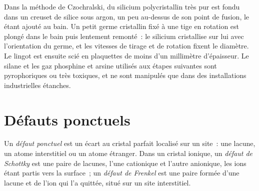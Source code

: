 \begin{inthelab}
Dans la méthode de Czochralski, du silicium polycristallin très pur est
fondu dans un creuset de silice sous argon, un peu au-dessus de son point
de fusion, le  étant ajouté au bain. Un petit germe cristallin fixé à
une tige en rotation est plongé dans le bain puis lentement remonté~: le
silicium cristallise sur lui avec l'orientation du germe, et les vitesses
de tirage et de rotation fixent le diamètre. Le lingot est ensuite scié en
plaquettes de moins d'un millimètre d'épaisseur. Le silane et les gaz
 phosphine et arsine utilisés aux étapes suivantes sont
pyrophoriques ou très toxiques, et ne sont manipulés que dans des
installations industrielles étanches.
\end{inthelab}

\section{Défauts ponctuels}

\begin{definition}\label{def:b3:solid-state:defects}
Un \emph{défaut ponctuel} est un écart au cristal parfait
localisé sur un site~: une lacune, un atome interstitiel ou un atome
étranger. Dans un cristal ionique, un \emph{défaut de Schottky} est une
paire de lacunes, l'une cationique et l'autre anionique, les ions étant
partis vers la surface~; un \emph{défaut de Frenkel} est une
paire formée d'une lacune et de l'ion qui l'a quittée, situé sur un site
interstitiel.
\end{definition}

